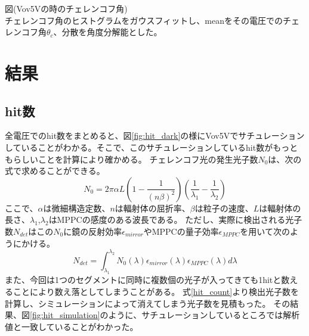 \documentclass[uplatex, titlepage, dvipdfmx, 12pt, a4paper]{jsreport}
\begin{document}
      図(Vov5Vの時のチェレンコフ角)\\
      チェレンコフ角のヒストグラムをガウスフィットし、meanをその電圧でのチェレンコフ角$\theta_{c}$、分散を角度分解能とした。

\chapter{結果}
  \section{hit数}
    全電圧でのhit数をまとめると、図\ref{fig:hit_dark}の様にVov5Vでサチュレーションしていることがわかる。そこで、このサチュレーションしているhit数がもっともらしいことを計算により確かめる。
    チェレンコフ光の発生光子数$N_{0}$は、次の式で求めることができる。
    \begin{equation}
        N_{0} = 2 \pi \alpha L  \left(1 - \frac{1}{(n\beta)^2}\right) \left(\frac{1}{\lambda_{1}} - \frac{1}{\lambda_{2}}\right)
    \end{equation}
    ここで、$\alpha$は微細構造定数、$n$は輻射体の屈折率、$\beta$は粒子の速度、$L$は輻射体の長さ、$\lambda_{1}$,$\lambda_{2}$はMPPCの感度のある波長である。
    ただし、実際に検出される光子数$N_{det}$はこの$N_{0}$に鏡の反射効率$\epsilon_{mirror}$やMPPCの量子効率$\epsilon_{MPPC}$を用いて次のようにかける。
    \begin{equation}
        N_{det} = \int^{\lambda_2}_{\lambda_1} N_{0}\left(\lambda\right) \epsilon_{mirror}\left(\lambda\right) \epsilon_{MPPC}\left(\lambda\right) d\lambda
        \label{hit_count}
    \end{equation}
    また、今回は1つのセグメントに同時に複数個の光子が入ってきても1hitと数えることにより数え落としてしまうことがある。
    式\ref{hit_count}より検出光子数を計算し、シミュレーションによって消えてしまう光子数を見積もった。
    その結果、図\ref{fig:hit_simulation}のように、サチュレーションしているところでは解析値と一致していることがわかった。
\end{document}
